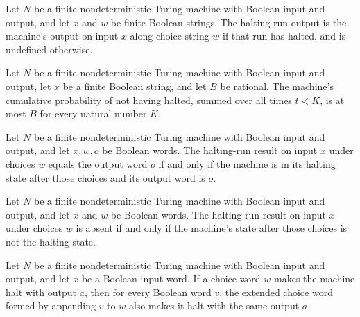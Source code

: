 \begin{definition}
\label{Turing.FinNDTM.haltRun}
\leanok
{}
Let $N$ be a finite nondeterministic Turing machine with Boolean input and output, and
let $x$ and $w$ be finite Boolean strings. The halting-run output is the machine's
output on input $x$ along choice string $w$ if that run has halted, and is undefined
otherwise.
\end{definition}

\begin{definition}
\label{Turing.FinNDTM.ExpTimeLe}
\leanok
{}
Let $N$ be a finite nondeterministic Turing machine with Boolean input and output, let
$x$ be a finite Boolean string, and let $B$ be rational. The machine's cumulative
probability of not having halted, summed over all times $t<K$, is at most $B$ for every
natural number $K$.
\end{definition}

\begin{theorem}
\label{Turing.FinNDTM.haltRun_eq_some_iff}
\leanok
{}
Let $N$ be a finite nondeterministic Turing machine with Boolean input and output, and
let $x,w,o$ be Boolean words. The halting-run result on input $x$ under choices $w$
equals the output word $o$ if and only if the machine is in its halting state after
those choices and its output word is $o$.
\end{theorem}

\begin{theorem}
\label{Turing.FinNDTM.haltRun_eq_none_iff}
\leanok
{}
Let $N$ be a finite nondeterministic Turing machine with Boolean input and output, and
let $x$ and $w$ be Boolean words. The halting-run result on input $x$ under choices $w$
is absent if and only if the machine’s state after those choices is not the halting
state.
\end{theorem}

\begin{theorem}
\label{Turing.FinNDTM.haltRun_isPrefixStable}
\leanok
{}
Let $N$ be a finite nondeterministic Turing machine with Boolean input and output, and
let $x$ be a Boolean input word. If a choice word $w$ makes the machine halt with output
$a$, then for every Boolean word $v$, the extended choice word formed by appending $v$
to $w$ also makes it halt with the same output $a$.
\end{theorem}

